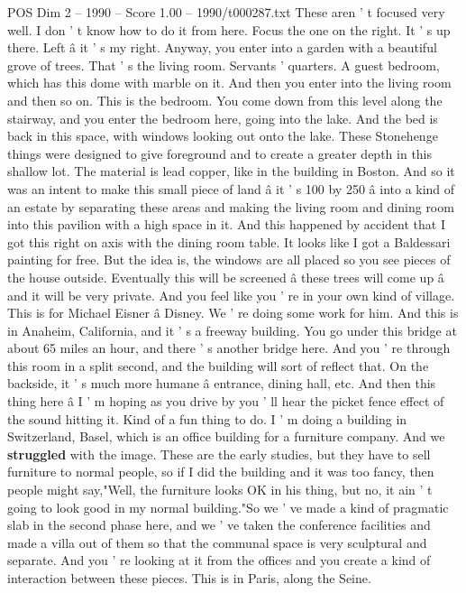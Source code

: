 \begin{textsample}{POS Dim 2 – 1990 – Score 1.00 – 1990/t000287.txt}
These aren ' t focused very well.
I don ' t know how to do it from here.
Focus the one on the right.
It ' s up there.
Left â it ' s my right.
Anyway, you enter into a garden with a beautiful grove of trees.
That ' s the living room.
Servants ' quarters.
A guest bedroom, which has this dome with marble on it.
And then you enter into the living room and then so on.
This is the bedroom.
You come down from this level along the stairway, and you enter the bedroom here, going into the lake.
And the bed is back in this space, with windows looking out onto the lake.
These Stonehenge things were designed to give foreground and to create a greater depth in this shallow lot.
The material is lead copper, like in the building in Boston.
And so it was an intent to make this small piece of land â it ' s 100 by 250 â into a kind of an estate by separating these areas and making the living room and dining room into this pavilion with a high space in it.
And this happened by accident that I got this right on axis with the dining room table.
It looks like I got a Baldessari painting for free.
But the idea is, the windows are all placed so you see pieces of the house outside.
Eventually this will be screened â these trees will come up â and it will be very private.
And you feel like you ' re in your own kind of village.
This is for Michael Eisner â Disney.
We ' re doing some work for him.
And this is in Anaheim, California, and it ' s a freeway building.
You go under this bridge at about 65 miles an hour, and there ' s another bridge here.
And you ' re through this room in a split second, and the building will sort of reflect that.
On the backside, it ' s much more humane â entrance, dining hall, etc.
And then this thing here â I ' m hoping as you drive by you ' ll hear the picket fence effect of the sound hitting it.
Kind of a fun thing to do.
I ' m doing a building in Switzerland, Basel, which is an office building for a furniture company.
And we \textbf{struggled} with the image.
These are the early studies, but they have to sell furniture to normal people, so if I did the building and it was too fancy, then people might say,"Well, the furniture looks OK in his thing, but no, it ain ' t going to look good in my normal building."So we ' ve made a kind of pragmatic slab in the second phase here, and we ' ve taken the conference facilities and made a villa out of them so that the communal space is very sculptural and separate.
And you ' re looking at it from the offices and you create a kind of interaction between these pieces.
This is in Paris, along the Seine.

\end{textsample}
